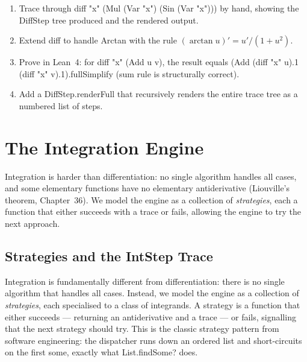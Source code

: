 \documentclass[12pt, openany]{book}
\theoremstyle{plain}
\theoremstyle{definition}
\theoremstyle{remark}
\newcommand{\li}[1]{{\ttfamily\small\color{tealaccent}#1}}
\begin{document}
\begin{exbox}
\begin{enumerate}
  \item Trace through \li{diff "x" (Mul (Var "x") (Sin (Var "x")))} by hand,
        showing the \li{DiffStep} tree produced and the rendered output.
  \item Extend \li{diff} to handle \li{Arctan} with the rule
        $(\arctan u)' = u'/(1+u^2)$.
  \item Prove in Lean~4: for \li{diff "x" (Add u v)}, the result equals
        \li{(Add (diff "x" u).1 (diff "x" v).1).fullSimplify} (sum rule is structurally correct).
  \item Add a \li{DiffStep.renderFull} that recursively renders the entire trace
        tree as a numbered list of steps.
\end{enumerate}
\end{exbox}
\color{black}

\chapter{The Integration Engine}
\color{black}

Integration is harder than differentiation: no single algorithm handles all cases,
and some elementary functions have no elementary antiderivative (Liouville's theorem,
Chapter~36).  We model the engine as a collection of \emph{strategies}, each a
function that either succeeds with a trace or fails, allowing the engine to try
the next approach.

\section{Strategies and the \li{IntStep} Trace}

Integration is fundamentally different from differentiation: there is no single algorithm that handles all cases.  Instead, we model the engine as a collection of \emph{strategies}, each specialised to a class of integrands.  A strategy is a function that either succeeds --- returning an antiderivative and a trace --- or fails, signalling that the next strategy should try.  This is the classic strategy pattern from software engineering: the dispatcher runs down an ordered list and short-circuits on the first \li{some}, exactly what \li{List.findSome?} does.
\end{document}
